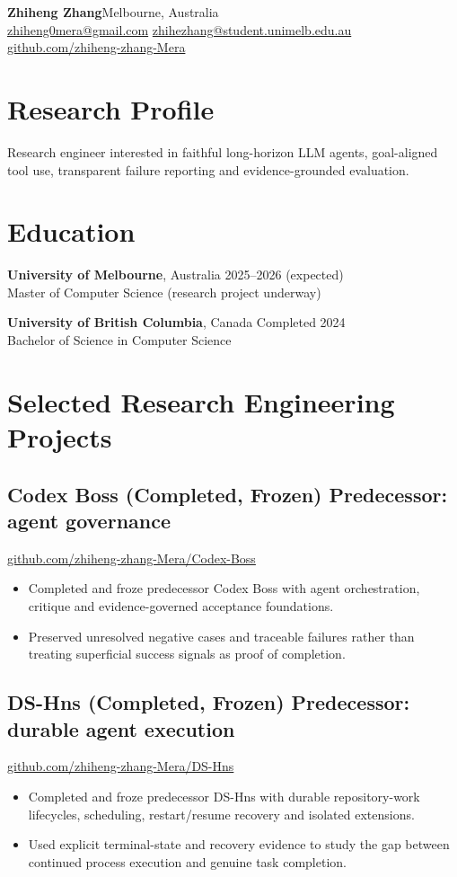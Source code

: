 \documentclass[10pt,a4paper]{article}
\begin{document}
{\LARGE\bfseries Zhiheng Zhang}\hfill Melbourne, Australia\\
\href{mailto:zhiheng0mera@gmail.com}{zhiheng0mera@gmail.com}\quad
\href{mailto:zhihezhang@student.unimelb.edu.au}{zhihezhang@student.unimelb.edu.au}\\
\href{https://github.com/zhiheng-zhang-Mera}{github.com/zhiheng-zhang-Mera}

\section{Research Profile}
Research engineer interested in faithful long-horizon LLM agents, goal-aligned tool use, transparent failure reporting and evidence-grounded evaluation.

\section{Education}
\textbf{University of Melbourne}, Australia \hfill 2025--2026 (expected)\\
Master of Computer Science (research project underway)

\textbf{University of British Columbia}, Canada \hfill Completed 2024\\
Bachelor of Science in Computer Science

\section{Selected Research Engineering Projects}
\subsection*{Codex Boss (Completed, Frozen) \hfill \small Predecessor: agent governance}
\href{https://github.com/zhiheng-zhang-Mera/Codex-Boss}{github.com/zhiheng-zhang-Mera/Codex-Boss}
\begin{itemize}
\item Completed and froze predecessor Codex Boss with agent orchestration, critique and evidence-governed acceptance foundations.
\item Preserved unresolved negative cases and traceable failures rather than treating superficial success signals as proof of completion.
\end{itemize}

\subsection*{DS-Hns (Completed, Frozen) \hfill \small Predecessor: durable agent execution}
\href{https://github.com/zhiheng-zhang-Mera/DS-Hns}{github.com/zhiheng-zhang-Mera/DS-Hns}
\begin{itemize}
\item Completed and froze predecessor DS-Hns with durable repository-work lifecycles, scheduling, restart/resume recovery and isolated extensions.
\item Used explicit terminal-state and recovery evidence to study the gap between continued process execution and genuine task completion.
\end{itemize}
\end{document}
